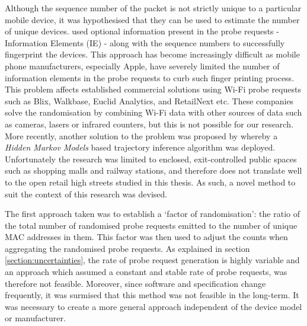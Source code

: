 Although the sequence number of the packet is not strictly unique to a particular mobile device, it was hypothesised that they can be used to estimate the number of unique devices.
\citet{vanhoef2016} used optional information present in the probe requests - Information Elements (IE) - along with the sequence numbers to successfully fingerprint the devices.
This approach has become increasingly difficult as mobile phone manufacturers, especially Apple, have severely limited the number of information elements in the probe requests to curb such finger printing process.
This problem affects established commercial solutions using Wi-Fi probe requests such as Blix, Walkbase, Euclid Analytics, and RetailNext etc.
These companies solve the randomisation by combining Wi-Fi data with other sources of data such as cameras, lasers or infrared counters, but this is not possible for our research.
More recently, another solution to the problem was  proposed by \citet{hong2018}\cite{hong2018} whereby a \textit{Hidden Markov Models} based trajectory inference algorithm was deployed.
Unfortunately the research was limited to enclosed, exit-controlled public spaces such as shopping malls and railway stations, and therefore does not translate well to the open retail high streets studied in this thesis.
As such, a novel method to suit the context of this research was devised.

The first approach taken was to establish a ‘factor of randomisation’: the ratio of the total number of randomised probe requests emitted  to the number of unique MAC addresses in them.
This factor was then used to adjust the counts when aggregating the randomised probe requests.
As explained in section \ref{section:uncertainties}, the rate of probe request generation is highly variable and an approach which assumed a constant and stable rate of probe requests, was therefore not feasible.
Moreover, since software and specification change frequently, it was surmised that this method was not feasible in the long-term.
It was necessary to create a more general approach independent of the device model or manufacturer.

